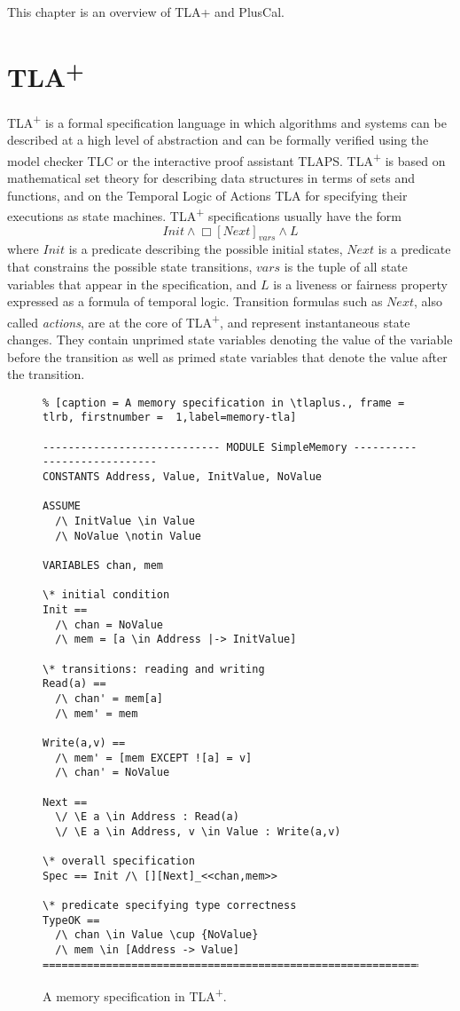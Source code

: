 \documentclass{thesul}
\newcommand{\tlaplus}{TLA\textsuperscript{+}\xspace}
\begin{document}
This chapter is an overview of TLA+ and PlusCal.
\section{\tlaplus}

\tlaplus is a formal specification language in which algorithms and systems can be described at a high level of abstraction and can be formally verified using the model checker TLC or the interactive proof assistant TLAPS. \tlaplus is based on mathematical set theory for describing data structures in terms of sets and functions, and on the Temporal Logic of Actions TLA for specifying their executions as state machines. \tlaplus specifications usually have the form
\[
  Init \land \Box[Next]_{vars} \land L
\]
where $Init$ is a predicate describing the possible initial states, $Next$ is a predicate that constrains the possible state transitions, $vars$ is the tuple of all state variables that appear in the specification, and $L$ is a liveness or fairness property expressed as a formula of temporal logic. Transition formulas such as $Next$, also called \emph{actions}, are at the core of \tlaplus, and represent instantaneous state changes. They contain unprimed state variables denoting the value of the variable before the transition as well as primed state variables that denote the value after the transition.

\begin{figure}
\begin{lstlisting}% [caption = A memory specification in \tlaplus., frame = tlrb, firstnumber =  1,label=memory-tla]

---------------------------- MODULE SimpleMemory ----------------------------
CONSTANTS Address, Value, InitValue, NoValue

ASSUME 
  /\ InitValue \in Value
  /\ NoValue \notin Value

VARIABLES chan, mem

\* initial condition
Init == 
  /\ chan = NoValue
  /\ mem = [a \in Address |-> InitValue]

\* transitions: reading and writing
Read(a) == 
  /\ chan' = mem[a]
  /\ mem' = mem

Write(a,v) ==
  /\ mem' = [mem EXCEPT ![a] = v]
  /\ chan' = NoValue

Next ==
  \/ \E a \in Address : Read(a)
  \/ \E a \in Address, v \in Value : Write(a,v)

\* overall specification
Spec == Init /\ [][Next]_<<chan,mem>>

\* predicate specifying type correctness
TypeOK == 
  /\ chan \in Value \cup {NoValue}
  /\ mem \in [Address -> Value] 
=============================================================================
\end{lstlisting}
\caption{A memory specification in \tlaplus.}
\label{memory-tla}
\end{figure}
\end{document}
